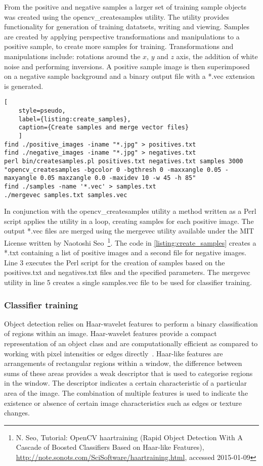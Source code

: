 From the positive and negative samples a larger set of training sample objects was created using the opencv\_createsamples utility. The utility provides functionality for generation of training datatsets, writing and viewing. Samples are created by applying perspective transformations and manipulations to a positive sample, to create more samples for training. Transformations and  manipulations include: rotations around the $x$, $y$ and $z$ axis, the addition of white noise and performing inversions. A positive sample image is then superimposed on a negative sample background and a binary output file with a *.vec extension is generated.

\begin{lstlisting}[
	style=pseudo,
	label={listing:create_samples},
	caption={Create samples and merge vector files}
	]
find ./positive_images -iname "*.jpg" > positives.txt
find ./negative_images -iname "*.jpg" > negatives.txt
perl bin/createsamples.pl positives.txt negatives.txt samples 3000 "opencv_createsamples -bgcolor 0 -bgthresh 0 -maxxangle 0.05 -maxyangle 0.05 maxzangle 0.0 -maxidev 10 -w 45 -h 85"
find ./samples -name '*.vec' > samples.txt
./mergevec samples.txt samples.vec
\end{lstlisting}

In conjunction with the opencv\_createsamples utility a method written as a Perl script applies the utility in a loop, creating samples for each positive image. The output *.vec files are merged using the mergevec utility available under the MIT License written by Naotoshi Seo~\footnote{N. Seo, Tutorial: OpenCV haartraining (Rapid Object Detection With A Cascade of Boosted Classifiers Based on Haar-like Features), \url{http://note.sonots.com/SciSoftware/haartraining.html}, accessed 2015-01-09}. The code in \autoref{listing:create_samples} creates a *.txt containing a list of positive images and a second file for negative images. Line 3 executes the Perl script for the creation of samples based on the positives.txt and negatives.txt files and the specified parameters. The mergevec utility in line 5 creates a single samples.vec file to be used for classifier training.

\subsubsection{Classifier training}
Object detection relies on Haar-wavelet features to perform a binary classification of regions within an image. Haar-wavelet features provide a compact representation of an object class and are computationally efficient as compared to working with pixel intensities or edges directly~\cite{Papageorgiou1998}. Haar-like features are arrangements of rectangular regions within a window, the difference between sums of these areas provides a weak descriptor that is used to categorise regions in the window. The descriptor indicates a certain characteristic of a particular area of the image. The combination of multiple features is used to indicate the existence or absence of certain image characteristics such as edges or texture changes.

